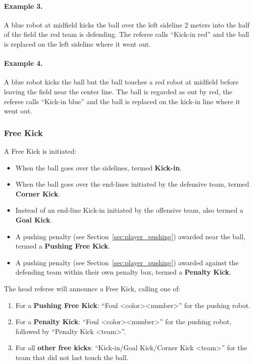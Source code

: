 \paragraph{Example 3.} A blue robot at midfield kicks the ball over the left sideline 2 meters into the half of the field the red team is defending. The referee calls ``Kick-in red'' and the ball is replaced on the left sideline where it went out.

\paragraph{Example 4.} A blue robot kicks the ball but the ball touches a red robot at midfield before leaving the field near the center line. The ball is regarded as out by red, the referee calls ``Kick-in blue'' and the ball is replaced on the kick-in line where it went out.

\subsubsection{Free Kick}
\label{sec:free_kick}
A Free Kick is initiated:
\begin{itemize}
  \item When the ball goes over the sidelines, termed \textbf{Kick-in}.
  \item When the ball goes over the end-lines initiated by the defensive team, termed \textbf{Corner Kick}.
  \item Instead of an end-line Kick-in initiated by the offensive team, also termed a \textbf{Goal Kick}.
  \item A pushing penalty (see Section~\ref{sec:player_pushing}) awarded near the ball, termed a \textbf{Pushing Free Kick}.
  \item A pushing penalty (see Section~\ref{sec:player_pushing}) awarded against the defending team within their own penalty box, termed a \textbf{Penalty Kick}.
\end{itemize}

The head referee will announce a Free Kick, calling one of:
\begin{enumerate}
  \item For a \textbf{Pushing Free Kick}: ``Foul \textless color\textgreater \textless number\textgreater'' for the pushing robot.
  \item For a \textbf{Penalty Kick}: ``Foul \textless color\textgreater \textless number\textgreater'' for the pushing robot, followed by ``Penalty Kick \textless team\textgreater''.
  \item For all \textbf{other free kicks}: ``Kick-in/Goal Kick/Corner Kick \textless team\textgreater'' for the team that did not last touch the ball.
\end{enumerate}

